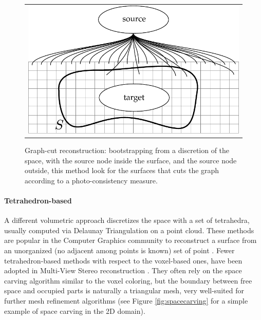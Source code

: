 \begin{figure}[t]
 \begin{tabular}{c}
  \includegraphics[width=0.96\columnwidth]{./img/ch_soa/graphcut}\\
 \end{tabular}
 \caption{Graph-cut reconstruction: bootstrapping from a discretion of the space, with the source node inside the surface, and the source node outside, this method look for the surfaces that cuts the graph according to a photo-consistency measure.}
 \label{fig:graphcut}
\end{figure}




\paragraph{Tetrahedron-based}
\label{sec:tet-based}
A different volumetric approach discretizes the space with a set of tetrahedra, usually computed via Delaunay Triangulation on a point cloud.
These methods are popular in the Computer Graphics community to reconstruct a surface from an unorganized (no adjacent among points is known) set of point \cite{amenta1999surface,amenta2001power,boissonnat1984geometric,dey2004provable,kolluri2004spectral}. 
Fewer tetrahedron-based methods with respect to the voxel-based ones, have been adopted in Multi-View Stereo reconstruction
\cite{faugeras_et_al_90,labatut2007efficient,salman2010surface,vu_et_al_2012,hiep2009towards,Pan_et_al09}.
They often rely on the space carving algorithm similar to the voxel coloring, but the boundary between free space and occupied parts is naturally a triangular mesh, very well-suited for further mesh refinement algorithms (see Figure \ref{fig:spacecarving} for a simple example of space carving in the 2D domain).




